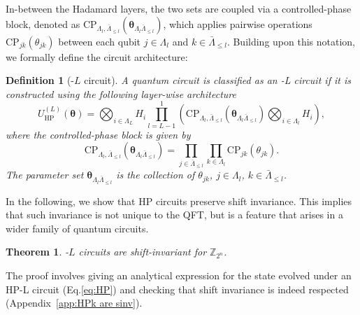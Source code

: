 \documentclass[reprint, aps, prl, superscriptaddress]{revtex4-2}
\newcommand{\myqc}{\text{HP}}
\newcommand{\uqc}[1]{U_{\mathrm{HP}}^{(#1)}}
\newcommand{\cpgate}[3]{\mathrm{CP}_{#1, #2}(#3)}
\newcommand{\Lambdacomp}[1]{\bar{\Lambda}_{\leq #1}}
\newtheorem{definition}{Definition}
\newtheorem{theorem}{Theorem}
\begin{document}
In-between the Hadamard layers, the two sets are coupled via a controlled-phase block, denoted as $\cpgate{\Lambda_l}{\Lambdacomp{l}}{\bm{\theta}_{\Lambda_l\Lambdacomp{l}}}$, which applies pairwise operations $\mathrm{CP}_{jk}(\theta_{jk})$ between each qubit $j \in \Lambda_l$ and $k \in \Lambdacomp{l}$. Building upon this notation, we formally define the circuit architecture:
\begin{definition}[\myqc-$L$ circuit]
    A quantum circuit is classified as an \myqc-L circuit if it is constructed using the following layer-wise architecture
    \begin{equation}
    \label{eq:HP}
        \uqc{L}({\bm{\theta}}) = \bigotimes_{i \in \Lambda_L} H_{i}\prod_{l=L-1}^{1} \left( \cpgate{\Lambda_l}{\Lambdacomp{l}}{\bm{\theta}_{\Lambda_l\Lambdacomp{l}}} \bigotimes_{i \in \Lambda_l} H_{i} \right),
    \end{equation}
    where the controlled-phase block is given by
    \begin{equation}
        \cpgate{\Lambda_l}{\Lambdacomp{l}}{\bm{\theta}_{\Lambda_l\Lambdacomp{l}}} = \prod_{j \in \Lambdacomp{l}} \prod_{k \in \Lambda_l} \mathrm{CP}_{jk}(\theta_{jk}).
    \end{equation}
    The parameter set $\bm{\theta}_{\Lambda_l\Lambdacomp{l}}$ is the collection of $\theta_{jk}$, $j\in \Lambda_l$, $k \in \Lambdacomp{l}$. 
\end{definition}


    
In the following, we show that HP circuits preserve shift invariance. This implies that such invariance is not unique to the QFT, but is a feature that arises in a wider family of quantum circuits. 


\begin{theorem}
\label{thm:hp_circuits_are_sinv}
    \myqc-$L$ circuits are shift-invariant for $\mathbb{Z}_{2^{n}}$.
\end{theorem}
The proof involves giving an analytical expression for the state evolved under an HP-L circuit (Eq.\eqref{eq:HP}) and checking that shift invariance is indeed respected (Appendix~\ref{app:HPk are sinv}).
\end{document}
